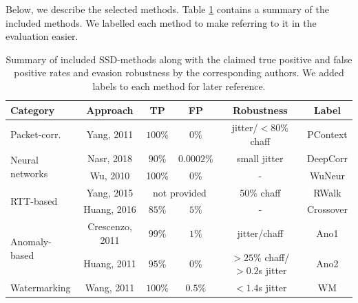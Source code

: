\documentclass[runningheads,11pt]{llncs}\usepackage[]{graphicx}\usepackage[]{color}
\begin{document}
Below, we describe the selected methods. Table \ref{Tab:Summary} contains a summary of the included methods. We labelled each method to make referring to it in the evaluation easier.

\begin{table}
\centering
\begin{tabular}{l|c|c|c|c|c}
Category & Approach & TP & FP & Robustness & Label\\ \hline

Packet-corr. & Yang, 2011 \cite{yang2011correlating} & $100\%$ & $0\%$& jitter/$<80\%$ chaff & PContext\\ \hline

\multirow{2}{*}{Neural networks} & Nasr, 2018 \cite{nasr2018deepcorr} &$90\%$ & $0.0002\%$& small jitter & DeepCorr\\ \cline{2-6}
 
 & Wu, 2010 \cite{wu2010neural} & 100\% & 0\% & - & WuNeur\\ \hline
 
\multirow{2}{*}{RTT-based} & Yang, 2015 \cite{yang2015rtt}& \multicolumn{2}{c|}{not provided} & $50\%$ chaff &RWalk\\ \cline{2-6}

& Huang, 2016 \cite{huang2016detecting} & $85\%$ & $5\%$ & - & Crossover\\ \hline
 
\multirow{2}{*}{Anomaly-based} & Crescenzo, 2011 \cite{di2011detecting} & $99\%$ & $1\%$ & jitter/chaff &Ano1\\ \cline{2-6}

& Huang, 2011 \cite{huang2011detecting,ding2013detecting} & $95\%$ & $0\%$ & $>25\%$ chaff/ $>0.2$s jitter &Ano2\\ \hline

Watermarking & Wang, 2011 \cite{wang2010robust} & $100\%$ & $0.5\%$ & $<1.4$s jitter & WM\\ \hline
\end{tabular}
\caption{Summary of included SSD-methods along with the claimed true positive and false positive rates and evasion robustness by the corresponding authors. We added labels to each method for later reference.}\label{Tab:Summary}
\end{table}



\end{document}
